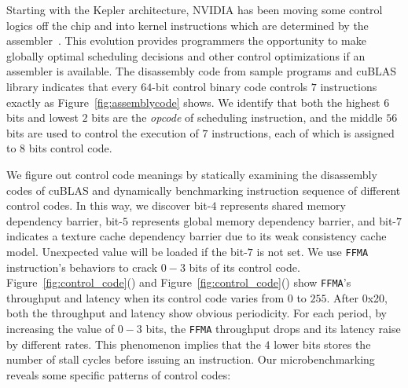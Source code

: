 Starting with the Kepler architecture, NVIDIA has been moving some control logics off the chip and into kernel
instructions which are determined by the assembler~\cite{lai,maxas}. This evolution provides programmers the opportunity to
make globally optimal scheduling decisions and other control optimizations if an assembler is available. The disassembly
code from sample programs and cuBLAS library indicates that every $64$-bit control binary code controls $7$ instructions
exactly as Figure~\ref{fig:assemblycode} shows.
We identify that both the highest $6$ bits and lowest
$2$ bits are the {\em opcode} of scheduling instruction, and the middle $56$ bits are used to control the execution of $7$
instructions, each of which is assigned to $8$ bits control code.

We figure out control code meanings by statically examining the disassembly codes of cuBLAS and
dynamically benchmarking instruction sequence of different control codes.
In this way, we discover bit-$4$ represents shared memory dependency barrier, bit-$5$ represents global memory dependency
barrier, and bit-$7$ indicates a texture cache dependency barrier due to its weak consistency cache model.
Unexpected value will be loaded if the bit-$7$ is not set.
We use {\tt FFMA} instruction's behaviors to crack $0-3$ bits of its control code.
Figure~\ref{fig:control_code}() and
Figure~\ref{fig:control_code}() show {\tt FFMA}'s throughput and latency when its control
code varies from $0$ to $255$.
After 0x20, both the throughput and latency show obvious periodicity.
For each period, by increasing the value of $0-3$ bits, the {\tt FFMA} throughput drops and its latency raise by different rates. 
This phenomenon implies that the $4$ lower bits stores the number of stall cycles before issuing
an instruction.
Our microbenchmarking reveals some specific patterns of control codes:

